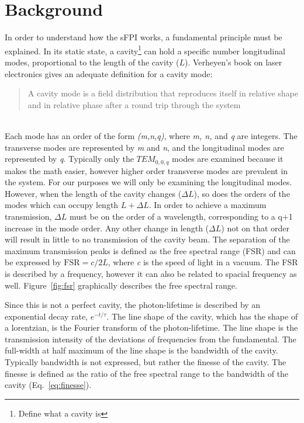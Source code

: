 \documentclass[12pt,journal]{IEEEtran}
\begin{document}
\section{Background} \label{ss:background}
In order to understand how the sFPI works, a fundamental principle must be explained. In its static state, a cavity\footnote{Define what a cavity is} can hold a specific number longitudinal modes, proportional to the length of the cavity ($L$). Verheyen's book on laser electronics gives an adequate definition for a cavity mode:
\\
\begin{quote}
A cavity mode is a field distribution that reproduces itself in relative shape and in relative phase after a round trip through the system~\cite{verdeyen}
\end{quote}
\leavevmode \\
\indent Each mode has an order of the form \textit{(m,n,q)}, where \textit{m, n,} and \textit{q} are integers. The transverse modes are represented by \textit{m} and \textit{n}, and the longitudinal modes are represented by \textit{q}. Typically only the $TEM_{0,0,q}$ modes are examined because it makes the math easier, however higher order transverse modes are prevalent in the system. For our purposes we will only be examining the longitudinal modes. However, when the length of the cavity changes ($\Delta L$), so does the orders of the modes which can occupy length $L+\Delta L$. In order to achieve a maximum transmission, $\Delta L$ must be on the order of a wavelength, corresponding to a q+1 increase in the mode order. Any other change in length ($\Delta L$) not on that order will result in little to no transmission of the cavity beam. The separation of the maximum transmission peaks is defined as the free spectral range (FSR) and can be expressed by $\text{FSR}=c/2L$, where \textit{c} is the speed of light in a vacuum. The FSR is described by a frequency, however it can also be related to spacial frequency as well. Figure~\ref{fig:fsr} graphically describes the free spectral range.

Since this is not a perfect cavity, the photon-lifetime is described by an exponential decay rate, $e^{-t/\tau}$. The line shape of the cavity, which has the shape of a lorentzian, is the Fourier transform of the photon-lifetime. The line shape is the transmission intensity of the deviations of frequencies from the fundamental. The full-width at half maximum of the line shape is the bandwidth of the cavity. Typically bandwidth is not expressed, but rather the finesse of the cavity. The finesse is defined as the ratio of the free spectral range to the bandwidth of the cavity (Eq.~\ref{eq:finesse}). 
\end{document}
